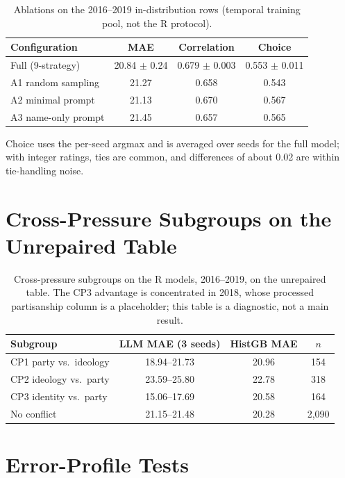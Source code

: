 \begin{table}[h]
\centering
\small
\caption{Ablations on the 2016--2019 in-distribution rows (temporal training
pool, not the R protocol).}
\label{tab:ablation_full}
\begin{tabular}{lccc}
\toprule
Configuration & MAE & Correlation & Choice \\
\midrule
Full (9-strategy) & 20.84 $\pm$ 0.24 & 0.679 $\pm$ 0.003 & 0.553 $\pm$ 0.011 \\
A1 random sampling & 21.27 & 0.658 & 0.543 \\
A2 minimal prompt & 21.13 & 0.670 & 0.567 \\
A3 name-only prompt & 21.45 & 0.657 & 0.565 \\
\bottomrule
\end{tabular}
\par\smallskip\footnotesize
Choice uses the per-seed argmax and is averaged over seeds for the full model;
with integer ratings, ties are common, and differences of about 0.02 are within
tie-handling noise.
\end{table}

\section{Cross-Pressure Subgroups on the Unrepaired Table}

\begin{table}[h]
\centering
\small
\caption{Cross-pressure subgroups on the R models, 2016--2019, on the
unrepaired table. The CP3 advantage is concentrated in 2018, whose processed
partisanship column is a placeholder; this table is a diagnostic, not a main
result.}
\label{tab:cp_full}
\begin{tabular}{lccc}
\toprule
Subgroup & LLM MAE (3 seeds) & HistGB MAE & $n$ \\
\midrule
CP1 party vs.\ ideology & 18.94--21.73 & 20.96 & 154 \\
CP2 ideology vs.\ party & 23.59--25.80 & 22.78 & 318 \\
CP3 identity vs.\ party & 15.06--17.69 & 20.58 & 164 \\
No conflict & 21.15--21.48 & 20.28 & 2,090 \\
\bottomrule
\end{tabular}
\end{table}

\section{Error-Profile Tests}

